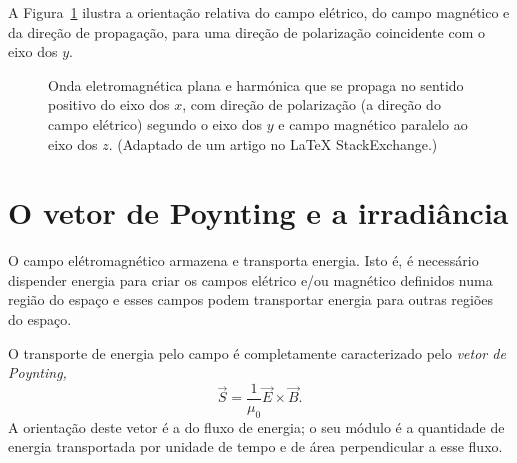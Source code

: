 A Figura~\ref{fig:plemwave} ilustra a orientação relativa do campo elétrico, do
campo magnético e da direção de propagação, para uma direção de polarização
coincidente com o eixo dos $y$.
\begin{figure}[htb]
  {\centering
      \par
    }
    \caption{Onda eletromagnética plana e harmónica que se propaga no sentido
    positivo do eixo dos $x$, com direção de polarização (a direção do campo
  elétrico) segundo o eixo dos $y$ e campo magnético paralelo ao eixo dos $z$.
  (Adaptado de um artigo no \LaTeX{} StackExchange.)\label{fig:plemwave}}
\end{figure}

\section{O vetor de Poynting e a irradiância}
O campo elétromagnético armazena e transporta energia. Isto é, é necessário
dispender energia para criar os campos elétrico e/ou magnético definidos numa
região do espaço e esses campos podem transportar energia para outras regiões do
espaço. 

O transporte de energia pelo campo é completamente caracterizado pelo
\emph{vetor de Poynting,}
\begin{equation}
  \vec S=\frac{1}{\mu_0}\vec E\times\vec B.
\end{equation}
A orientação deste vetor é a do fluxo de energia; o seu módulo é a quantidade de
energia transportada por unidade de tempo e de área perpendicular a esse fluxo.

